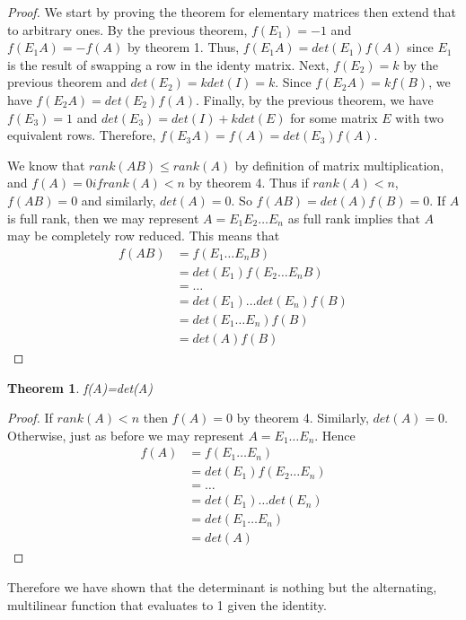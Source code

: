 \documentclass{article}
\newtheorem{thm}{Theorem}
\begin{document}
\begin{proof}
We start by proving the theorem for elementary matrices then extend that to arbitrary ones. 
By the previous theorem, $f(E_1)=-1$ and $f(E_1A)=-f(A)$ by theorem 1. Thus, $f(E_1A)=det(E_1)f(A)$ since $E_1$ is the result of swapping a row in the identy matrix. Next, $f(E_2)=k$ by the previous theorem and $det(E_2)=kdet(I)=k$. Since $f(E_2A)=kf(B)$, we have $f(E_2A)=det(E_2)f(A)$. Finally, by the previous theorem, we have $f(E_3)=1$ and $det(E_3)=det(I)+kdet(E)$ for some matrix $E$ with two equivalent rows. Therefore, $f(E_3A)=f(A)=det(E_3)f(A)$.

We know that $rank(AB)\leq rank(A)$ by definition of matrix multiplication, and $f(A)=0 if rank(A)<n$ by theorem 4. Thus if $rank(A)<n$, 
$f(AB)=0$ and similarly, $det(A)=0$. So $f(AB)=det(A)f(B)=0$. 
If $A$ is full rank, then we may represent $A=E_1E_2\dots E_n$ as full rank implies that $A$ may be completely row reduced. This means that 
\begin{align}
f(AB)&=f(E_1\dots E_nB) \\ 
&=det(E_1)f(E_2\dots E_nB) \\ 
&= \dots \\
&=det(E_1)\dots det(E_n)f(B) \\ 
&=det(E_1\dots E_n)f(B) \\ 
&=det(A)f(B)
\end{align}
\end{proof}
\begin{thm}
f(A)=det(A)	
\end{thm}
\begin{proof}
If $rank(A)<n$ then $f(A)=0$ by theorem 4. Similarly, $det(A)=0$. 
Otherwise, just as before we may represent $A=E_1 \dots E_n$. Hence  
\begin{align}
f(A)&=f(E_1\dots E_n) \\
&=det(E_1)f(E_2 \dots E_n) \\
&= \dots \\ 
&=det(E_1)\dots det(E_n) \\ 
&=det(E_1\dots E_n) \\
&=det(A)
\end{align}
\end{proof}
Therefore we have shown that the determinant is nothing but the alternating, multilinear function that evaluates to 1 given the identity.
\end{document}
